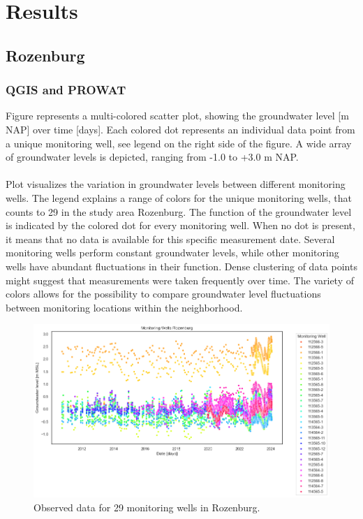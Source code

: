 \chapter{Results}
\label{chapter:results}


\section{Rozenburg}
\subsection{QGIS and PROWAT}
Figure  represents a multi-colored scatter plot, showing the groundwater level [m NAP] over time [days]. Each colored dot represents an individual data point from a unique monitoring well, see legend on the right side of the figure. A wide array of groundwater levels is depicted, ranging from -1.0 to +3.0 m NAP. \\
\\
Plot  visualizes the variation in groundwater levels between different monitoring wells. The legend explains a range of colors for the unique monitoring wells, that counts to 29 in the study area Rozenburg. The function of the groundwater level is indicated by the colored dot for every monitoring well. When no dot is present, it means that no data is available for this specific measurement date. Several monitoring wells perform constant groundwater levels, while other monitoring wells have abundant fluctuations in their function. Dense clustering of data points might suggest that measurements were taken frequently over time. The variety of colors allows for the possibility to compare groundwater level fluctuations between monitoring locations within the neighborhood. 

\begin{figure}[h]
    \centering
    \includegraphics[width=0.80\linewidth]{frontmatter/Rozenburg-fig/rozscatter.png}
    \caption{Observed data for 29 monitoring wells in Rozenburg.}
    \label{beforeroz}
\end{figure}\\

